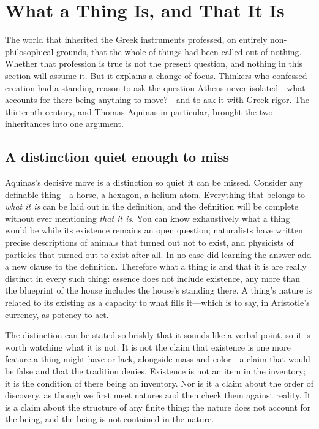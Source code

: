 \section{What a Thing Is, and That It Is}

The world that inherited the Greek instruments professed, on entirely non-philosophical grounds, that the whole of things had been called out of nothing. Whether that profession is true is not the present question, and nothing in this section will assume it. But it explains a change of focus. Thinkers who confessed creation had a standing reason to ask the question Athens never isolated---what accounts for there being anything to move?---and to ask it with Greek rigor. The thirteenth century, and Thomas Aquinas in particular, brought the two inheritances into one argument.

\subsection{A distinction quiet enough to miss}

Aquinas's decisive move is a distinction so quiet it can be missed. Consider any definable thing---a horse, a hexagon, a helium atom. Everything that belongs to \emph{what it is} can be laid out in the definition, and the definition will be complete without ever mentioning \emph{that it is}. You can know exhaustively what a thing would be while its existence remains an open question; naturalists have written precise descriptions of animals that turned out not to exist, and physicists of particles that turned out to exist after all. In no case did learning the answer add a new clause to the definition. Therefore what a thing is and that it is are really distinct in every such thing: essence does not include existence, any more than the blueprint of the house includes the house's standing there. A thing's nature is related to its existing as a capacity to what fills it---which is to say, in Aristotle's currency, as potency to act.

The distinction can be stated so briskly that it sounds like a verbal point, so it is worth watching what it is not. It is not the claim that existence is one more feature a thing might have or lack, alongside mass and color---a claim that would be false and that the tradition denies. Existence is not an item in the inventory; it is the condition of there being an inventory. Nor is it a claim about the order of discovery, as though we first meet natures and then check them against reality. It is a claim about the structure of any finite thing: the nature does not account for the being, and the being is not contained in the nature.

